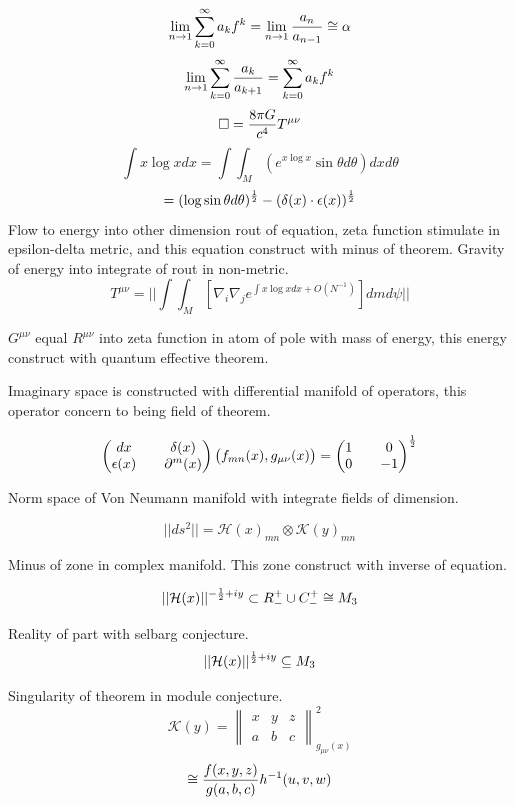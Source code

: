 \documentclass{jsarticle}
\begin{document}
   $$ \lim_{n \to 1}\sum_{k=0}^{\infty}a_k f^k = \lim_{n \to 1} {a_n \over a_{n-1}} \cong \alpha $$
   $$ \lim_{n \to 1} \sum_{k=0}^{\infty}{a_k \over a_{k+1}} = \sum_{k=0}^{\infty}a_k f^k $$
   $$ \square = {8 \pi G \over c^4}T^{\mu\nu} $$
   $$ \int x \log x dx = \int \int_M(e^{x \log x}\sin \theta d \theta)dx d \theta $$
   $$ = (\log \sin \theta d \theta)^{1 \over 2} - (\delta(x) \cdot \epsilon (x))^{1 \over 2} $$
   Flow to energy into other dimension rout of equation, zeta function stimulate in epsilon-delta metric,
and this equation construct with minus of theorem.
   Gravity of energy into integrate of rout in non-metric.
   $$ T^{\mu\nu} = ||\int \int_M[\nabla_{i}\nabla_{j} e^{\int x \log x dx + O(N^{-1})}]dmd\psi || $$

   $ G^{\mu\nu} $ equal $ R^{\mu\nu} $ into zeta function in atom of pole with mass of energy,
   this energy construct with quantum effective theorem.

  Imaginary space is constructed with differential manifold of operators, this operator concern to being 
field of theorem.

$$ \begin{pmatrix} dx && \delta(x) \\
\epsilon(x) && \partial^m (x) \end{pmatrix} \begin{pmatrix} f_{mn}(x), g_{\mu\nu}(x)
\end{pmatrix} = \begin{pmatrix} 1 && 0 \\
0 && -1 \end{pmatrix}^{1 \over 2} $$

  Norm space of Von Neumann manifold with integrate fields of dimension.

  $$ ||ds^2|| = \mathcal{H}(x)_{mn} \otimes \mathcal{K}(y)_{mn} $$

  Minus of zone in complex manifold.
  This zone construct with inverse of equation.

  $$ ||\mathcal{H}(x)||^{-{1 \over 2} + iy} \subset R^{+}_{-} \cup C^{+}_{-} \cong M_3 $$

  Reality of part with selbarg conjecture.
  $$ ||\mathcal{H}(x) ||^{{1 \over 2} + iy} \subseteq M_3 $$

  Singularity of theorem in module conjecture.
  $$ \mathcal{K}(y) = \begin{Vmatrix} x & y & z \\
  a & b & c \end{Vmatrix}^2_{g_{\mu\nu}(x)} $$
  $$ \cong {f(x,y,z) \over g(a,b,c)}h^{-1}(u,v,w) $$
  
\end{document}
